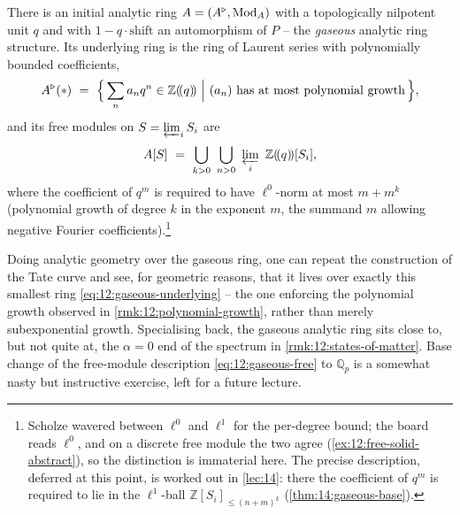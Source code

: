 \begin{theorem}
\label{thm:12:gaseous}
There is an initial analytic ring $A=(A^{\triangleright},\operatorname{Mod}_A)$ with a topologically
nilpotent unit $q$ and with $1-q\cdot\mathrm{shift}$ an automorphism of $P$ --
the \emph{gaseous} analytic ring structure. Its underlying ring is the ring of
Laurent series with polynomially bounded coefficients,
\begin{equation}
\label{eq:12:gaseous-underlying}
A^{\triangleright}(\ast)\ =\ \Bigl\{\,\sum_n a_n q^{n}\in\mathbb{Z}(\!(q)\!)\ \Big|\
(a_n)\ \text{has at most polynomial growth}\,\Bigr\},
\end{equation}
and its free modules on $S=\varprojlim_i S_i$ are
\begin{equation}
\label{eq:12:gaseous-free}
A[S]\ =\ \bigcup_{k>0}\ \bigcup_{n>0}\ \varprojlim_i\ \mathbb{Z}(\!(q)\!)[S_i],
\end{equation}
where the coefficient of $q^{m}$ is required to have $\ell^{0}$-norm at most
$m+m^{k}$ (polynomial growth of degree $k$ in the exponent $m$, the summand $m$
allowing negative Fourier coefficients).\footnote{Scholze wavered between
$\ell^{0}$ and $\ell^{1}$ for the per-degree bound; the board reads $\ell^{0}$,
and on a discrete free module the two agree (\cref{ex:12:free-solid-abstract}),
so the distinction is immaterial here. The precise description, deferred at this
point, is worked out in \cref{lec:14}: there the coefficient of $q^{m}$ is
required to lie in the $\ell^{1}$-ball $\mathbb{Z}[S_i]_{\le(n+m)^{k}}$
(\cref{thm:14:gaseous-base}).}
\end{theorem}

\begin{remark}
\label{rmk:12:tate-over-gaseous}
Doing analytic geometry over the gaseous ring, one can repeat the construction of
the Tate curve and see, for geometric reasons, that it lives over exactly this
smallest ring \eqref{eq:12:gaseous-underlying} -- the one enforcing the
polynomial growth observed in \cref{rmk:12:polynomial-growth}, rather than merely
subexponential growth. Specialising back, the gaseous analytic ring sits close
to, but not quite at, the $\alpha=0$ end of the spectrum in
\cref{rmk:12:states-of-matter}. Base change of the free-module description
\eqref{eq:12:gaseous-free} to $\mathbb{Q}_p$ is a somewhat nasty but instructive
exercise, left for a future lecture.
\end{remark}

